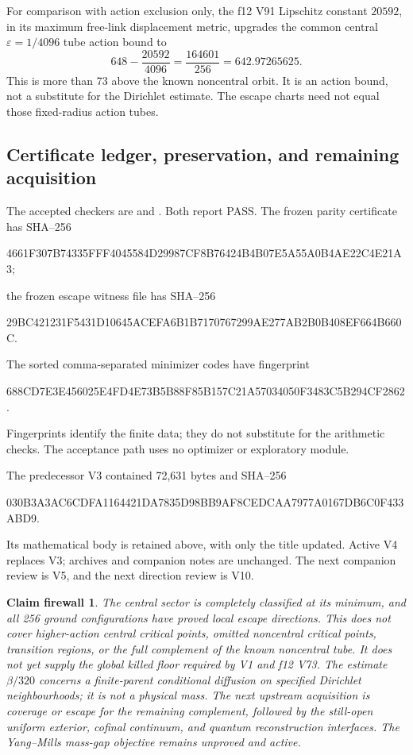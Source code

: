 \documentclass[11pt,oneside]{article}
\newtheorem{firewall}[theorem]{Claim firewall}
\begin{document}
For comparison with action exclusion only, the f12
V91 Lipschitz constant \(20592\), in its maximum
free-link displacement metric, upgrades the common
central \(\varepsilon=1/4096\) tube action bound to
\[
 648-\frac{20592}{4096}
       =\frac{164601}{256}=642.97265625 .
\]
This is more than 73 above the known noncentral
orbit. It is an action bound, not a substitute for
the Dirichlet estimate. The escape charts need not
equal those fixed-radius action tubes.

\subsection{Certificate ledger, preservation, and remaining acquisition}

The accepted checkers are
and
.
Both report PASS. The frozen parity certificate has SHA--256
\begin{center}\scriptsize\ttfamily
4661F307B74335FFF4045584D29987CF8B76424B4B07E5A55A0B4AE22C4E21A3;
\end{center}
the frozen escape witness file has SHA--256
\begin{center}\scriptsize\ttfamily
29BC421231F5431D10645ACEFA6B1B7170767299AE277AB2B0B408EF664B660C.
\end{center}
The sorted comma-separated minimizer codes have fingerprint
\begin{center}\scriptsize\ttfamily
688CD7E3E456025E4FD4E73B5B88F85B157C21A57034050F3483C5B294CF2862.
\end{center}
Fingerprints identify the finite data; they do not
substitute for the arithmetic checks. The acceptance
path uses no optimizer or exploratory module.

The predecessor V3 contained 72,631 bytes and SHA--256
\begin{center}\scriptsize\ttfamily
030B3A3AC6CDFA1164421DA7835D98BB9AF8CEDCAA7977A0167DB6C0F433ABD9.
\end{center}
Its mathematical body is retained above, with only
the title updated. Active V4 replaces V3; archives
and companion notes are unchanged. The next companion
review is V5, and the next direction review is V10.

\begin{firewall}
The central sector is completely classified at its
minimum, and all 256 ground configurations have proved
local escape directions. This does not cover higher-action
central critical points, omitted noncentral critical points,
transition regions, or the full complement of the known
noncentral tube. It does not yet supply the global killed
floor required by V1 and f12 V73. The estimate
\(\beta/320\) concerns a finite-parent conditional
diffusion on specified Dirichlet neighbourhoods; it is
not a physical mass. The next upstream acquisition is
coverage or escape for the remaining complement, followed
by the still-open uniform exterior, cofinal continuum,
and quantum reconstruction interfaces. The Yang--Mills
mass-gap objective remains unproved and active.
\end{firewall}
\end{document}
